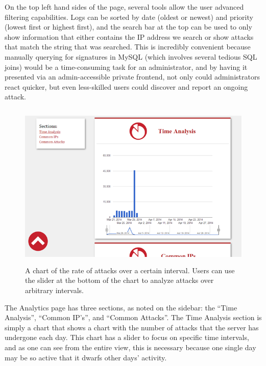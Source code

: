 \documentclass[11.5pt,letterpaper,titlepage]{report}
\begin{document}
On the top left hand sides of the page, several tools allow the user advanced
filtering capabilities. Logs can be sorted by date (oldest or newest) and
priority (lowest first or highest first), and the search bar at the top can be
used to only show information that either contains the IP address we search or
show attacks that match the string that was searched. This is incredibly
convenient because manually querying for signatures in MySQL (which involves
several tedious SQL joins) would be a time-consuming task for an administrator,
and by having it presented via an admin-accessible private frontend, not only
could administrators react quicker, but even less-skilled users could discover
and report an ongoing attack.

\begin{figure}[h!]
\centering
  \includegraphics[height=8cm]{./timeanalysis.png}
  \caption{A chart of the rate of attacks over a certain interval. Users
  can use the slider at the bottom of the chart to analyze attacks over
  arbitrary intervals.}
\end{figure}

The Analytics page has three sections, as noted on the sidebar: the “Time
Analysis”, “Common IP’s”, and “Common Attacks”. The Time Analysis section is
simply a chart that shows a chart with the number of attacks that the server has
undergone each day. This chart has a slider to focus on specific time intervals,
and as one can see from the entire view, this is necessary because one single
day may be so active that it dwarfs other days’ activity.
\end{document}
